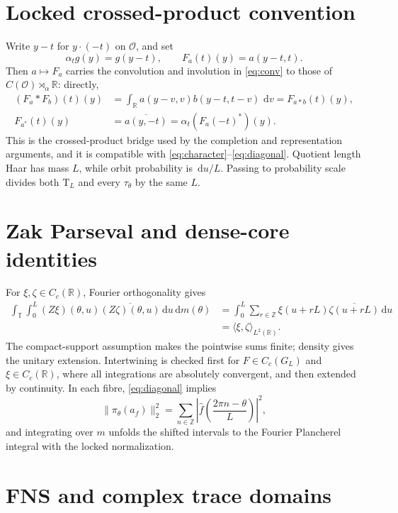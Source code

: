 \documentclass[11pt]{article}
\theoremstyle{definition}
\newcommand{\R}{\mathbb{R}}
\newcommand{\Z}{\mathbb{Z}}
\newcommand{\T}{\mathbb{T}}
\newcommand{\dd}{\,\mathrm{d}}
\newcommand{\Tau}{\mathrm{T}}
\begin{document}
\appendix

\section{Locked crossed-product convention}

Write \(y-t\) for \(y\cdot(-t)\) on \(\mathcal O\), and set
\[
 \alpha_tg(y)=g(y-t),\qquad F_a(t)(y)=a(y-t,t).
\]
Then \(a\mapsto F_a\) carries the convolution and involution in \eqref{eq:conv} to those of \(C(\mathcal O)\rtimes_\alpha\R\): directly,
\begin{align*}
 (F_a*F_b)(t)(y)&=\int_{\R}a(y-v,v)b(y-t,t-v)\,\dd v=F_{a*b}(t)(y),\\
 F_{a^{*}}(t)(y)&=\overline{a(y,-t)}=\alpha_t(F_a(-t)^{*})(y).
\end{align*}
This is the crossed-product bridge used by the completion and representation arguments, and it is compatible with \eqref{eq:character}--\eqref{eq:diagonal}.  Quotient length Haar has mass \(L\), while orbit probability is \(\dd u/L\).  Passing to probability scale divides both \(\Tau_L\) and every \(\tau_\theta\) by the same \(L\).

\section{Zak Parseval and dense-core identities}

For \(\xi,\zeta\in C_c(\R)\), Fourier orthogonality gives
\begin{align*}
 \int_{\T}\int_0^L (Z\xi)(\theta,u)\overline{(Z\zeta)(\theta,u)}\dd u\dd m(\theta)
 &=\int_0^L\sum_{r\in\Z}\xi(u+rL)\overline{\zeta(u+rL)}\dd u\\
 &=\langle\xi,\zeta\rangle_{L^2(\R)}.
\end{align*}
The compact-support assumption makes the pointwise sums finite; density gives the unitary extension.  Intertwining is checked first for \(F\in C_c(G_L)\) and \(\xi\in C_c(\R)\), where all integrations are absolutely convergent, and then extended by continuity.  In each fibre, \eqref{eq:diagonal} implies
\[
 \|\pi_\theta(a_f)\|_2^2
 =\sum_{n\in\Z}\left|\widehat f\left(\frac{2\pi n-\theta}{L}\right)\right|^2,
\]
and integrating over \(m\) unfolds the shifted intervals to the Fourier Plancherel integral with the locked normalization.

\section{FNS and complex trace domains}
\end{document}

